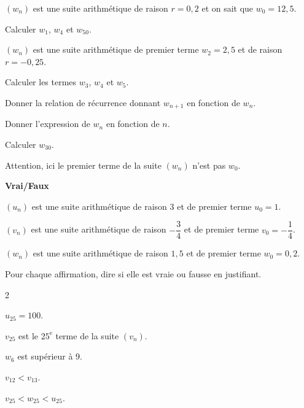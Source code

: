 \documentclass[12pt,a4paper]{book}
\begin{document}
\exerciceDS{}

$(w_n)$ est une suite arithmétique de raison $r=0,2$ et on sait que $w_0=12,5$.
\begin{itemMet}
	\item Calculer $w_1$, $w_4$ et $w_{50}$.
\end{itemMet}

\exerciceDS{}

$(w_n)$ est une suite arithmétique de premier terme $w_2=2,5$ et de raison $r=-0,25$.
\begin{enumMet}
	\item Calculer les termes $w_3$, $w_4$ et $w_5$.
	\item Donner la relation de récurrence donnant $w_{n+1}$ en fonction de $w_n$.
	\item Donner l'expression de $w_n$ en fonction de $n$.
	\item Calculer $w_{30}$.
\end{enumMet}

\begin{battention}
	Attention, ici le premier terme de la suite $(w_n)$ n'est pas $w_0$.
\end{battention}


\exerciceDS{}

\textbf{Vrai/Faux}
\begin{itemMet}
	\item $(u_n)$ est une suite arithmétique de raison 3 et de premier terme $u_0=1$.
	\item $(v_n)$ est une suite arithmétique de raison $-\dfrac{3}{4}$ et de premier terme $v_0=-\dfrac{1}{4}$.
	\item $(w_n)$ est une suite arithmétique de raison $1,5$ et de premier terme $w_0=0,2$.
\end{itemMet}

Pour chaque affirmation, dire si elle est vraie ou fausse en justifiant.
\begin{multicols}{2}
	\begin{enumMet}
	\item $u_{25}=100$.
	\item $v_{25}$ est le $25^{\text{e}}$ terme de la suite $(v_n)$.
	\item $w_6$ est supérieur à 9.
	\item $v_{12}<v_{13}$.
	\item $v_{25}<w_{25}<u_{25}$.
\end{enumMet}
\end{multicols}
\end{document}
